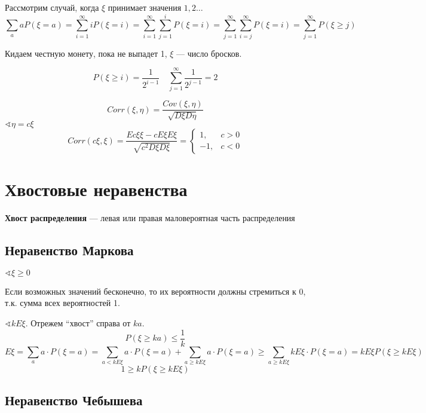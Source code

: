 

\cfoot{}



Рассмотрим случай, когда $\xi$ принимает значения $1,2\ldots$
$$\sum\limits_{a} a P(\xi=a) = \sum\limits_{i=1}^\infty i P(\xi=i)=\sum\limits_{i=1}^\infty \sum\limits_{j=1}^i P(\xi=i)=\sum\limits_{j=1}^\infty \sum\limits_{i=j}^\infty P(\xi=i)= \sum\limits_{j=1}^\infty P(\xi\geq j)$$

Кидаем честную монету, пока не выпадет 1, $\xi$ --- число бросков.

$$P(\xi\geq i) = \frac{1}{2^{i-1}} \quad \sum\limits_{j=1}^\infty \frac{1}{2^{j-1}}=2$$

$$Corr(\xi, \eta) = \frac{Cov(\xi, \eta)}{\sqrt{D\xi D\eta}}$$
$\sphericalangle \eta=c\xi$
$$Corr(c\xi, \xi) = \frac{Ec\xi\xi - cE\xi E\xi}{\sqrt{c^2D\xi D\xi}}=\begin{cases}
    1, & c > 0 \\
    -1, & c < 0
\end{cases}$$

\section{Хвостовые неравенства}

\begin{definition}
    \textbf{Хвост распределения} --- левая или правая маловероятная часть распределения
\end{definition}

\subsection{Неравенство Маркова}

$\sphericalangle \xi\geq 0$

Если возможных значений бесконечно, то их вероятности должны стремиться к 0, т.к. сумма всех вероятностей 1.

$\sphericalangle kE\xi$. Отрежем ``хвост'' справа от $ka$.
$$P(\xi\geq ka)\leq\frac{1}{k}$$
$$E\xi=\sum\limits_a a\cdot P(\xi=a) = \sum\limits_{a<kE\xi} a\cdot P(\xi=a) + \sum\limits_{a\geq kE\xi}a\cdot P(\xi=a) \geq \sum\limits_{a\geq kE\xi} kE\xi\cdot P(\xi=a)=kE\xi P(\xi\geq kE\xi)$$
$$1\geq kP(\xi\geq kE\xi)$$

\subsection{Неравенство Чебышева}

